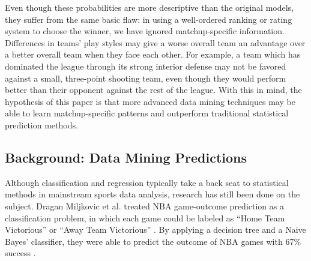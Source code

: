 \documentclass[]{article}
\begin{document}
Even though these probabilities are more descriptive than the original models, they suffer from the same basic flaw: in using a well-ordered ranking or rating system to choose the winner, we have ignored matchup-specific information. Differences in teams' play styles may give a worse overall team an advantage over a better overall team when they face each other. For example, a team which has dominated the league through its strong interior defense may not be favored against a small, three-point shooting team, even though they would perform better than their opponent against the rest of the league. With this in mind, the hypothesis of this paper is that more advanced data mining techniques may be able to learn matchup-specific patterns and outperform traditional statistical prediction methods.

\subsection{Background: Data Mining Predictions}

Although classification and regression typically take a back seat to statistical methods in mainstream sports data analysis, research has still been done on the subject. Dragan Miljkovic et al. treated NBA game-outcome prediction as a classification problem, in which each game could be labeled as ``Home Team Victorious'' or ``Away Team Victorious'' \cite{nbapredictions}. By applying a decision tree and a Naive Bayes' classifier, they were able to predict the outcome of NBA games with 67\% success \cite{nbapredictions}.
\end{document}
